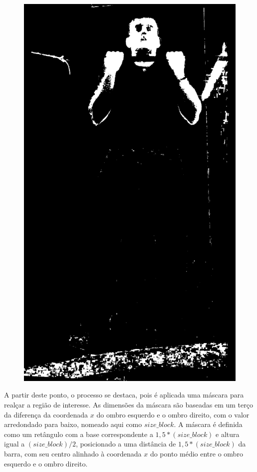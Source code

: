 \begin{figure}[H]
\begin{minipage}{\sizeImg\textwidth}
            \includegraphics[width=\textwidth]{figuras/ultrapassar_barra/134_limited.png}
        \end{minipage}
    \label{fig:bin_ultrapassar_barra}
\end{figure}
\renewcommand{\sizeImg}{0.4}


A partir deste ponto, o processo se destaca, pois é aplicada uma máscara para realçar a região de interesse. As dimensões da máscara são baseadas em um terço da diferença da coordenada $x$ do ombro esquerdo e o ombro direito, com o valor arredondado para baixo, nomeado aqui como $size\_block$. A máscara é definida como um retângulo com a base correspondente a $1,5*(size\_block)$ e altura igual a $(size\_block)/2$, posicionado a uma distância de $1,5*(size\_block)$ da barra, com seu centro alinhado à coordenada $x$ do ponto médio entre o ombro esquerdo e o ombro direito.
 
